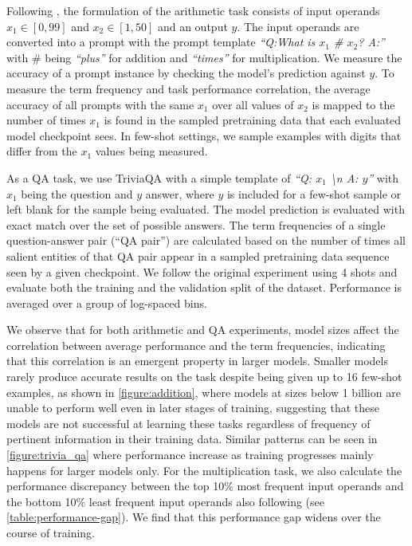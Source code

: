 Following \citet{razeghi2022impact}, the formulation of the arithmetic task consists of input operands $x_1 \in [0,99]$ and $x_2 \in [1,50]$ and an output $y$. The input operands are converted into a prompt with the prompt template \textit{``Q:What is $x_1$ \# $x_2$? A:''} with \# being \textit{``plus''} for addition and \textit{``times''} for multiplication. We measure the accuracy of a prompt instance by checking the model's prediction against $y$. To measure the term frequency and task performance correlation, the average accuracy of all prompts with the same $x_1$ over all values of $x_2$ is mapped to the number of times $x_1$ is found in the sampled pretraining data that each evaluated model checkpoint sees. In few-shot settings, we sample examples with digits that differ from the $x_1$ values being measured. 

As a QA task, we use TriviaQA \citep{joshi2017triviaqa} with a simple template of \textit{``Q: $x_1$ \textbackslash n A: $y$''} with $x_1$ being the question and $y$ answer, where $y$ is included for a few-shot sample or left blank for the sample being evaluated. The model prediction is evaluated with exact match over the set of possible answers. The term frequencies of a single question-answer pair (``QA pair'') are calculated based on the number of times all salient entities of that QA pair appear in a sampled pretraining data sequence seen by a given checkpoint. We follow the original experiment using 4 shots and evaluate both the training and the validation split of the dataset. Performance is averaged over a group of log-spaced bins. 

We observe that for both arithmetic and QA experiments, model sizes affect the correlation between average performance and the term frequencies, indicating that this correlation is an emergent property in larger models. Smaller models rarely produce accurate results on the task despite being given up to 16 few-shot examples, as shown in \ref{figure:addition}, where models at sizes below 1 billion are unable to perform well even in later stages of training, suggesting that these models are not successful at learning these tasks regardless of frequency of pertinent information in their training data. Similar patterns can be seen in \ref{figure:trivia_qa} where performance increase as training progresses mainly happens for larger models only. For the multiplication task, we also calculate the performance discrepancy between the top 10\% most frequent input operands and the bottom 10\% least frequent input operands also following \citet{razeghi2022impact} (see \ref{table:performance-gap}). We find that this performance gap widens over the course of training.

